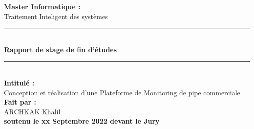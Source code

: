 \documentclass[11pt,french]{report}
\begin{document}

\begin{titlepage}

\begin{center}

\par
{}
\hfill{}
\par
\vspace*{1.3cm}

\linespread{1.3}\huge {\bfseries Master Informatique :}\\\Huge{Traitement Inteligent des systèmes}

\rule{\textwidth}{2pt}\\[0.3cm]
\huge{\bfseries Rapport de stage de fin d'études}
\rule{\textwidth}{2pt}\\[0.3cm]

\linespread{1.5}\huge {\bfseries Intitulé :}\\
Conception et réalisation d’une Plateforme de Monitoring de pipe
commerciale \\[0,3cm]

\linespread{1.3}\huge {\bfseries Fait par :}\\{\huge ARCHKAK Khalil}\\[0.5cm]

\noindent \Large{\textbf{soutenu le xx Septembre 2022 devant le Jury}} \\[0.7cm]



\end{center}
\end{titlepage}
\end{document}
